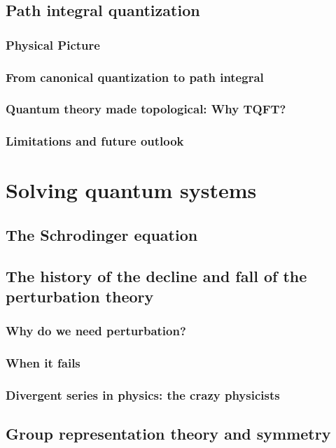 \documentclass[a4paper,11pt]{article}
\theoremstyle{definition}
\begin{document}
\subsection{Path integral quantization}
\subsubsection{Physical Picture}
\subsubsection{From canonical quantization to path integral}
\subsubsection{Quantum theory made topological: Why TQFT?}
\subsubsection{Limitations and future outlook}

\section{Solving quantum systems}
\subsection{The Schrodinger equation}

\subsection{The history of the decline and fall of the perturbation theory}
\subsubsection{Why do we need perturbation?}
\subsubsection{When it fails}
\subsubsection{Divergent series in physics: the crazy physicists}

\subsection{Group representation theory and symmetry}
\end{document}
